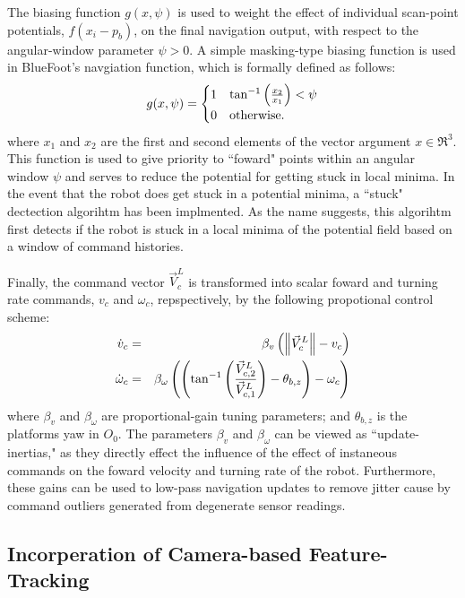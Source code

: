 The biasing function $g(x,\psi)$ is used to weight the effect of individual scan-point potentials, $f(x_{i}-p_{b})$, on the final navigation output, with respect to the angular-window parameter $\psi>0$. A simple masking-type biasing function is used in BlueFoot's navgiation function, which is formally defined as follows:
	\begin{equation}
		g(x,\psi) = 
		\begin{cases}
		1	& \tan^{-1}\left( \frac{x_{2}}{x_{1}} \right) < \psi \\
		0 	& \text{otherwise}.
		\end{cases}
	\end{equation}
where $x_{1}$ and $x_{2}$ are the first and second elements of the vector argument $x\in\Re^{3}$. This function is used to give priority to ``foward" points within an angular window $\psi$ and serves to reduce the potential for getting stuck in local minima. In the event that the robot does get stuck in a potential minima, a ``stuck" dectection algorihtm has been implmented. As the name suggests, this algorihtm first detects if the robot is stuck in a local minima of the potential field based on a window of command histories.

Finally, the command vector $\vec{V}_{c}^{L}$ is transformed into scalar foward and turning rate commands, $v_{c}$ and $\omega_{c}$, repspectively, by the following propotional control scheme:
	\begin{eqnarray}
	\dot{v}_{c} 		&=& \beta_{v} \left( \left\lVert \vec{V}_{c}^{L} \right\rVert - v_{c} \right) \nonumber \\
	\dot{\omega}_{c} &=& \beta_{\omega} \left(  \left( \tan^{-1}\left( \frac{\vec{V}_{c,2}^{L}}{\vec{V}_{c,1}^{L}} \right) - \theta_{b,z} \right) - \omega_{c} \right)
	\end{eqnarray}
where $\beta_{v}$ and $\beta_{\omega}$ are proportional-gain tuning parameters; and $\theta_{b,z}$ is the platforms yaw in $O_{0}$. The parameters $\beta_{v}$ and $\beta_{\omega}$ can be viewed as ``update-inertias," as they directly effect the influence of the effect of instaneous commands on the foward velocity and turning rate of the robot. Furthermore, these gains can be used to low-pass navigation updates to remove jitter cause by command outliers generated from degenerate sensor readings.

		\subsection{Incorperation of Camera-based Feature-Tracking}
		

